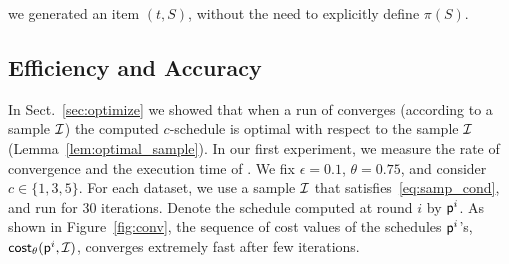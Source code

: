 we generated an item $(t,S)$, without the need to explicitly define $\pi(S)$.





\subsection{Efficiency and Accuracy}
In Sect.~\ref{sec:optimize} we showed that when a run of \algonameapx converges
(according to a sample $\mathcal{I}$) the computed $c$-schedule is optimal with
respect to the sample $\mathcal{I}$ (Lemma~\ref{lem:optimal_sample}). In our first
experiment, we measure the rate of convergence and the execution time of
\algonameapx. We fix $\epsilon=0.1$, $\theta=0.75$, and consider
$c\in\{1,3,5\}$. For each dataset, we use a sample $\mathcal{I}$ that satisfies~\eqref{eq:samp_cond}, and run \algonameapx
for 30 iterations. Denote the schedule computed at round $i$ by $\mathsf{p}^i$.
As shown in Figure~\ref{fig:conv}, the sequence of cost values of the schedules
$\mathsf{p}^i$'s, $\mathsf{cost}_\theta(\mathsf{p}^i,\mathcal{I})$, converges extremely fast after few iterations.

